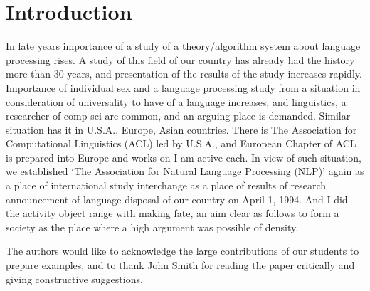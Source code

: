\documentclass[english,tombow,other]{jnlp_3.3}
\begin{document}
\maketitle

\section{Introduction}

In late years importance of a study of a theory/algorithm system 
about language processing rises\cite{Article_01}. 
A study of this field of our country has already had the history 
more than 30 years, 
and presentation of the results of the study increases rapidly. 
Importance of individual sex and a language processing study from a situation 
in consideration of universality to have of a language increases, 
and linguistics, a researcher of comp-sci are common, 
and an arguing place is demanded\cite{Book_02}. 
Similar situation has it in U.S.A., Europe, Asian countries. 
There is The Association for Computational Linguistics (ACL) led by U.S.A., 
and European Chapter of ACL is prepared into Europe and works on I am active each. 
In view of such situation\cite{Inproc_03}, 
we established `The Association for Natural Language Processing (NLP)' 
again as a place of international study interchange as 
a place of results of research announcement of language disposal of 
our country on April 1, 1994\cite{Masters_04,Techrep_05}. 
And I did the activity object range with making fate, 
an aim clear as follows to form a society as the place 
where a high argument was possible of density\nocite{Web_06}.


\acknowledgment

The authors would like to acknowledge the large contributions of our
students to prepare examples, and to thank John Smith for reading the
paper critically and giving constructive suggestions.




\begin{biography}


\end{biography}

\end{document}
